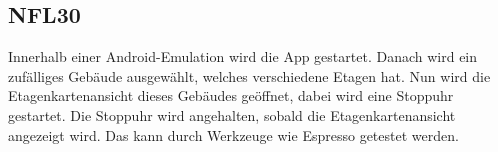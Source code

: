 \subsection*{NFL30}

Innerhalb einer \Gls{Android}-\Gls{Emulation} wird die App gestartet.
Danach wird ein zufälliges Gebäude ausgewählt, welches verschiedene Etagen hat.
Nun wird die \Gls{Etagenkartenansicht} dieses Gebäudes geöffnet, dabei wird eine Stoppuhr gestartet.
Die Stoppuhr wird angehalten, sobald die \Gls{Etagenkartenansicht} angezeigt wird.
Das kann durch Werkzeuge wie \Gls{Espresso} getestet werden.